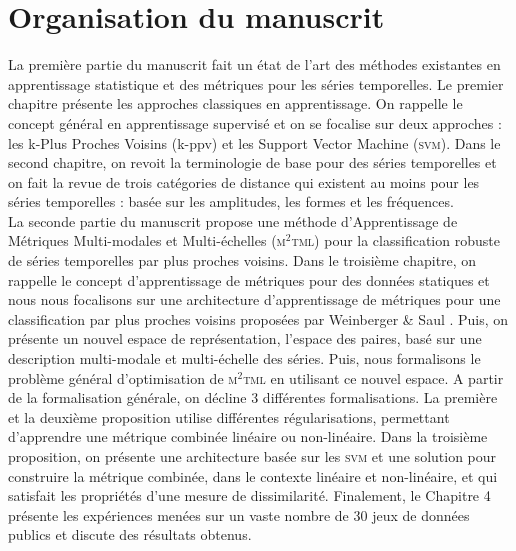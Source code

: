 \section*{Organisation du manuscrit}
La première partie du manuscrit fait un état de l'art des méthodes existantes en apprentissage statistique et des métriques pour les séries temporelles. Le premier chapitre présente les approches classiques en apprentissage. On rappelle le concept général en apprentissage supervisé et on se focalise sur deux approches : les k-Plus Proches Voisins (k-ppv) et les Support Vector Machine (\textsc{svm}). Dans le second chapitre, on revoit la terminologie de base pour des séries temporelles et on fait la revue de trois catégories de distance qui existent au moins pour les séries temporelles : basée sur les amplitudes, les formes et les fréquences. \\
La seconde partie du manuscrit propose une méthode d'Apprentissage de Métriques Multi-modales et Multi-échelles (\textsc{m$^2$tml}) pour la classification robuste de séries temporelles par plus proches voisins. Dans le troisième chapitre, on rappelle le concept d'apprentissage de métriques pour des données statiques et nous nous focalisons sur une architecture d'apprentissage de métriques pour une classification par plus proches voisins proposées par Weinberger \& Saul \cite{Weinberger2009}. Puis, on présente un nouvel espace de représentation, l'espace des paires, basé sur une description multi-modale et multi-échelle des séries. Puis, nous formalisons le problème général d'optimisation de \textsc{m$^2$tml} en utilisant ce nouvel espace. A partir de la formalisation générale, on décline 3 différentes formalisations. La première et la deuxième proposition utilise différentes régularisations, permettant d'apprendre une métrique combinée linéaire ou non-linéaire. Dans la troisième proposition, on présente une architecture basée sur les \textsc{svm} et une solution pour construire la métrique combinée, dans le contexte linéaire et non-linéaire, et qui satisfait les propriétés d'une mesure de dissimilarité. Finalement, le Chapitre 4 présente les expériences menées sur un vaste nombre de 30 jeux de données publics et discute des résultats obtenus.
